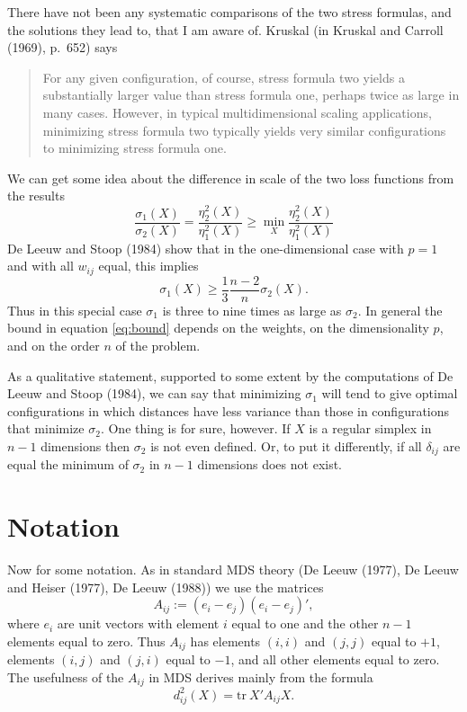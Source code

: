 \documentclass[
  12pt,
]{article}
\theoremstyle{definition}
\theoremstyle{definition}
\theoremstyle{definition}
\theoremstyle{definition}
\theoremstyle{remark}
\begin{document}
There have not been any systematic comparisons of the two stress formulas, and
the solutions they lead to, that I am aware of.
Kruskal (in Kruskal and Carroll (1969), p.~652) says

\begin{quote}
For any given configuration, of course, stress formula two yields
a substantially larger value than stress formula one, perhaps twice
as large in many cases. However, in typical multidimensional scaling
applications, minimizing stress formula two typically yields very similar
configurations to minimizing stress formula one.
\end{quote}

We can get some idea about the difference in scale of the two loss functions from the results
\begin{equation}
\frac{\sigma_1(X)}{\sigma_2(X)}=\frac{\eta_2^2(X)}{\eta_1^2(X)}\geq\min_X\frac{\eta_2^2(X)}{\eta_1^2(X)}
\label{eq:compa}
\end{equation}
De Leeuw and Stoop (1984) show that in the one-dimensional case with \(p=1\) and with
all \(w_{ij}\) equal, this implies
\begin{equation}
\sigma_1(X)\geq\frac13\frac{n-2}{n}\sigma_2(X).
\label{eq:bound}
\end{equation}
Thus in this special case \(\sigma_1\) is three to nine times as large as
\(\sigma_2\). In general the bound in equation \eqref{eq:bound} depends on the weights, on the dimensionality \(p\), and on the order \(n\) of the problem.

As a qualitative statement, supported to some extent by the computations of De Leeuw and Stoop (1984),
we can say that minimizing \(\sigma_1\) will
tend to give optimal configurations in which distances have less variance than those in
configurations that minimize \(\sigma_2\). One thing is for sure, however. If \(X\)
is a regular simplex in \(n-1\) dimensions then \(\sigma_2\) is not even defined.
Or, to put it differently, if all \(\delta_{ij}\) are equal the minimum of
\(\sigma_2\) in \(n-1\) dimensions does not exist.

\section{Notation}\label{notation}

Now for some notation. As in standard MDS theory (De Leeuw (1977), De Leeuw and Heiser (1977), De Leeuw (1988)) we use the matrices
\begin{equation}
A_{ij}:=(e_i-e_j)(e_i-e_j)',
\label{eq:adef}
\end{equation}
where \(e_i\) are unit vectors with element \(i\) equal to one and the other \(n-1\) elements equal to zero.
Thus \(A_{ij}\) has elements \((i,i)\) and \((j,j)\) equal to \(+1\), elements \((i,j)\) and \((j,i)\) equal to
\(-1\), and all other elements equal to zero. The usefulness of the \(A_{ij}\) in MDS derives mainly from the
formula
\begin{equation}
d_{ij}^2(X)=\text{tr}\ X'A_{ij}X.
\label{eq:d2froma}
\end{equation}
\end{document}
